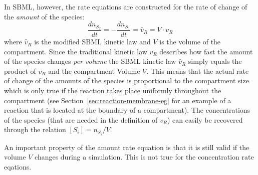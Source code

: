 In SBML, however, the rate equations are constructed for the rate
of change of the \emph{amount }of the species:\[
\frac{dn_{S_{2}}}{dt}=-\frac{dn_{S_{1}}}{dt}=\hat{v}_{R}=V\cdot v_{R}\]
where $\hat{v}_{R}$ is the modified SBML kinetic law and $V$ is
the volume of the compartment. Since the traditional kinetic law $v_{R}$
describes how fast the amount of the species changes \emph{per volume}
the SBML kinetic law $\hat{v}_{R}$ simply equals the product of $v_{R}$
and the compartment Volume $V$. This means that the actual rate of
change of the amounts of the species is proportional to the compartment
size which is only true if the reaction takes place uniformly throughout
the compartment (see Section~\ref{sec:reaction-membrane-eg} for
an example of a reaction that is located at the boundary of a compartment).
The concentrations of the species (that are needed in the definition
of $v_{R}$) can easily be recovered through the relation $[S_{i}]=n_{S_{i}}/V$. 

An important property of the amount rate equation is that it is still
valid if the volume $V$ changes during a simulation. This is not
true for the concentration rate eqations. 

